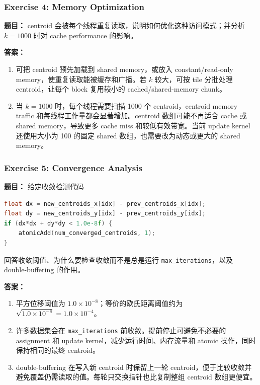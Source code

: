 \documentclass[10pt,a4paper]{article}
\begin{document}
\subsubsection{Exercise 4: Memory Optimization}
\noindent\textbf{题目：} centroid 会被每个线程重复读取，说明如何优化这种访问模式；并分析 $k=1000$ 时对 cache performance 的影响。

\noindent\textbf{答案：}
\begin{enumerate}[label=\arabic*.]
\item 可把 centroid 预先加载到 shared memory，或放入 constant/read-only memory，使重复读取能被缓存和广播。若 $k$ 较大，可按 tile 分批处理 centroid，让每个 block 复用较小的 cached/shared-memory chunk。
\item 当 $k=1000$ 时，每个线程需要扫描 1000 个 centroid，centroid memory traffic 和每线程工作量都会显著增加。centroid 数组可能不再适合 cache 或 shared memory，导致更多 cache miss 和较低有效带宽。当前 update kernel 还使用大小为 100 的固定 shared 数组，也需要改为动态或更大的 shared memory。
\end{enumerate}

\subsubsection{Exercise 5: Convergence Analysis}
\noindent\textbf{题目：} 给定收敛检测代码
\begin{lstlisting}[language=C++]
float dx = new_centroids_x[idx] - prev_centroids_x[idx];
float dy = new_centroids_y[idx] - prev_centroids_y[idx];
if (dx*dx + dy*dy < 1.0e-8f) {
    atomicAdd(num_converged_centroids, 1);
}
\end{lstlisting}
回答收敛阈值、为什么要检查收敛而不是总是运行 \texttt{max\_iterations}，以及 double-buffering 的作用。

\noindent\textbf{答案：}
\begin{enumerate}[label=\arabic*.]
\item 平方位移阈值为 $1.0\times10^{-8}$；等价的欧氏距离阈值约为 $\sqrt{1.0\times10^{-8}}=1.0\times10^{-4}$。
\item 许多数据集会在 \texttt{max\_iterations} 前收敛。提前停止可避免不必要的 assignment 和 update kernel，减少运行时间、内存流量和 atomic 操作，同时保持相同的最终 centroid。
\item double-buffering 在写入新 centroid 时保留上一轮 centroid，便于比较收敛并避免覆盖仍需读取的值。每轮只交换指针也比复制整组 centroid 数组更便宜。
\end{enumerate}
\end{document}
